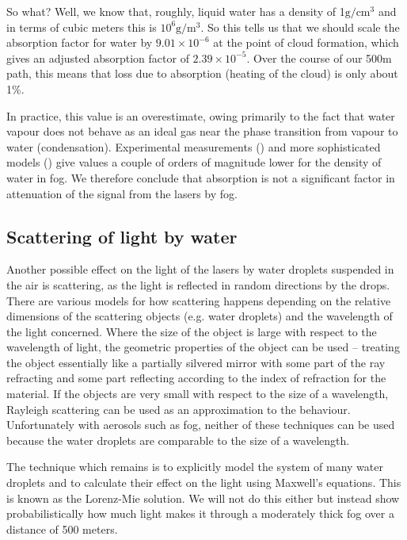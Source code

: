 So what? Well, we know that, roughly, liquid water has a density of
1$\text{g}/\text{cm}^3$ and in terms of cubic meters this is
$10^6\text{g}/\text{m}^3$. So this tells us that we should scale the
absorption factor for water by $9.01\times 10^{-6}$ at the point of
cloud formation, which gives an adjusted absorption factor of
$2.39\times 10^{-5}$. Over the course of our 500m path, this means
that loss due to absorption (heating of the cloud) is only about
1\%.

In practice, this value is an overestimate, owing primarily to the
fact that water vapour does not behave as an ideal gas near the phase
transition from vapour to water (condensation). Experimental
measurements (\cite{whiteman_cloud_1999}) and more sophisticated
models (\cite{tampieri_size_1976,hess_optical_1998}) give values a
couple of orders of magnitude lower for the density of water in
fog. We therefore conclude that absorption is not a significant factor
in attenuation of the signal from the lasers by fog.

\subsection{Scattering of light by water}
\label{sec:scattering}
Another possible effect on the light of the lasers by water droplets
suspended in the air is scattering, as the light is reflected in
random directions by the drops. There are various models for how
scattering happens depending on the relative dimensions of the
scattering objects (e.g. water droplets) and the wavelength of the
light concerned. Where the size of the object is large with respect to
the wavelength of light, the geometric properties of the object can be
used -- treating the object essentially like a partially silvered
mirror with some part of the ray refracting and some part reflecting
according to the index of refraction for the material. If the objects
are very small with respect to the size of a wavelength, Rayleigh
scattering can be used as an approximation to the
behaviour. Unfortunately with aerosols such as fog, neither of these
techniques can be used because the water droplets are comparable to
the size of a wavelength.

The technique which remains is to explicitly model the system of many
water droplets and to calculate their effect on the light using
Maxwell's equations. This is known as the Lorenz-Mie solution. We will
not do this either but instead show probabilistically how much light
makes it through a moderately thick fog over a distance of 500 meters.

